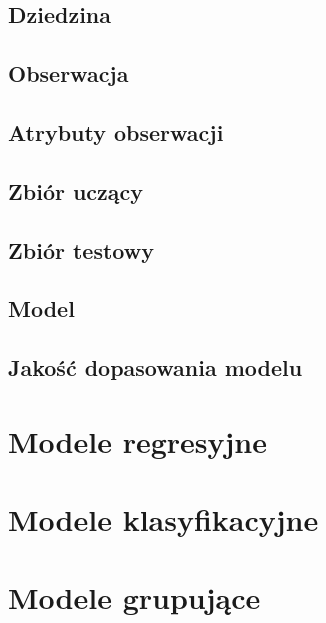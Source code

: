 \documentclass[]{book}
\theoremstyle{plain}
\theoremstyle{definition}
\begin{document}
\hypertarget{dziedzina}{%
\subsection{Dziedzina}\label{dziedzina}}

\hypertarget{obserwacja}{%
\subsection{Obserwacja}\label{obserwacja}}

\hypertarget{atrybuty-obserwacji}{%
\subsection{Atrybuty obserwacji}\label{atrybuty-obserwacji}}

\hypertarget{zbior-uczacy}{%
\subsection{Zbiór uczący}\label{zbior-uczacy}}

\hypertarget{zbior-testowy}{%
\subsection{Zbiór testowy}\label{zbior-testowy}}

\hypertarget{model}{%
\subsection{Model}\label{model}}

\hypertarget{jakosc-dopasowania-modelu}{%
\subsection{Jakość dopasowania modelu}\label{jakosc-dopasowania-modelu}}

\hypertarget{modele-regresyjne}{%
\section{Modele regresyjne}\label{modele-regresyjne}}

\hypertarget{modele-klasyfikacyjne}{%
\section{Modele klasyfikacyjne}\label{modele-klasyfikacyjne}}

\hypertarget{modele-grupujace}{%
\section{Modele grupujące}\label{modele-grupujace}}
\end{document}
